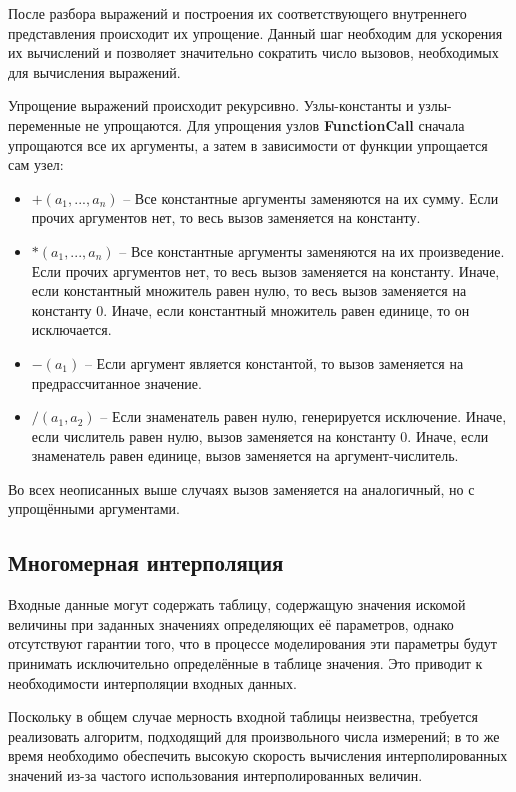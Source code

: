 После разбора выражений и построения их соответствующего внутреннего 
представления происходит их упрощение. Данный шаг необходим для ускорения их 
вычислений и позволяет значительно сократить число вызовов, необходимых для 
вычисления выражений.

Упрощение выражений происходит рекурсивно. Узлы-константы и узлы-переменные не 
упрощаются. Для упрощения узлов \textbf{FunctionCall} сначала упрощаются все их 
аргументы, а затем в зависимости от функции упрощается сам узел:
\begin{itemize}
    \item $+(a_1, ..., a_n) $ -- Все константные аргументы заменяются на их 
    сумму. Если прочих аргументов нет, то весь вызов заменяется на константу.
    \item $*(a_1, ..., a_n) $ -- Все константные аргументы заменяются на их 
    произведение. Если прочих аргументов нет, то весь вызов заменяется на 
    константу. Иначе, если константный множитель равен нулю, то весь вызов 
    заменяется на константу $0$. Иначе, если константный множитель равен 
    единице, то он исключается.
    \item $-(a_1) $ -- Если аргумент является константой, то вызов заменяется 
    на предрассчитанное значение.
    \item $/(a_1, a_2) $ -- Если знаменатель равен нулю, генерируется 
    исключение. Иначе, если числитель равен нулю, вызов заменяется на константу 
    $0$. Иначе, если знаменатель равен единице, вызов заменяется на 
    аргумент-числитель.
\end{itemize}

Во всех неописанных выше случаях вызов заменяется на аналогичный, но с 
упрощёнными аргументами.


\subsection{Многомерная интерполяция}
Входные данные могут содержать таблицу, содержащую значения искомой величины 
при заданных значениях определяющих её параметров, однако отсутствуют гарантии 
того, что в процессе моделирования эти параметры будут принимать исключительно 
определённые в таблице значения. Это приводит к необходимости интерполяции 
входных данных.

Поскольку в общем случае мерность входной таблицы неизвестна, требуется 
реализовать алгоритм, подходящий для произвольного числа измерений; в то же 
время необходимо обеспечить высокую скорость вычисления интерполированных 
значений из-за частого использования интерполированных величин.


